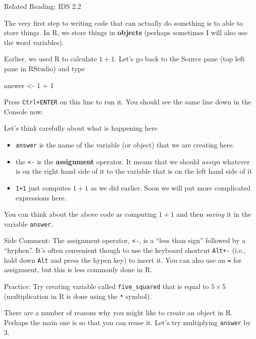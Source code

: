 \documentclass[
  letterpaper,
  DIV=11,
  numbers=noendperiod]{scrreprt}
\newenvironment{Shaded}{\begin{snugshade}}{\end{snugshade}}
\newcommand{\DecValTok}[1]{\textcolor[rgb]{0.68,0.00,0.00}{#1}}
\newcommand{\NormalTok}[1]{\textcolor[rgb]{0.00,0.23,0.31}{#1}}
\newcommand{\OtherTok}[1]{\textcolor[rgb]{0.00,0.23,0.31}{#1}}
\newcommand{\SpecialCharTok}[1]{\textcolor[rgb]{0.37,0.37,0.37}{#1}}
\begin{document}
Related Reading: IDS 2.2

The very first step to writing code that can actually do something is to
able to store things. In R, we store things in \textbf{objects} (perhaps
sometimes I will also use the word variables).

Earlier, we used R to calculate \(1+1\). Let's go back to the Source
pane (top left pane in RStudio) and type

\begin{Shaded}
\begin{Highlighting}[]
\NormalTok{answer }\OtherTok{\textless{}{-}} \DecValTok{1} \SpecialCharTok{+} \DecValTok{1}
\end{Highlighting}
\end{Shaded}

Press \texttt{Ctrl+ENTER} on this line to run it. You should see the
same line down in the Console now.

Let's think carefully about what is happening here

\begin{itemize}
\item
  \texttt{answer} is the name of the variable (or object) that we are
  creating here.
\item
  the \texttt{\textless{}-} is the \textbf{assignment} operator. It
  means that we should \emph{assign} whatever is on the right hand side
  of it to the variable that is on the left hand side of it
\item
  \texttt{1+1} just computes \(1+1\) as we did earlier. Soon we will put
  more complicated expressions here.
\end{itemize}

You can think about the above code as computing \(1+1\) and then
\emph{saving} it in the variable \texttt{answer}.

{Side Comment:} The assignment operator, \texttt{\textless{}-}, is a
``less than sign'' followed by a ``hyphen''. It's often convenient
though to use the keyboard shortcut \texttt{Alt+-} (i.e., hold down
\texttt{Alt} and press the hypen key) to insert it. You can also use an
\texttt{=} for assignment, but this is less commonly done in R.

{Practice:} Try creating variable called \texttt{five\_squared} that is
equal to \(5 \times 5\) (multiplication in R is done using the
\texttt{*} symbol).

There are a number of reasons why you might like to create an object in
R. Perhaps the main one is so that you can reuse it. Let's try
multiplying \texttt{answer} by \(3\).
\end{document}
